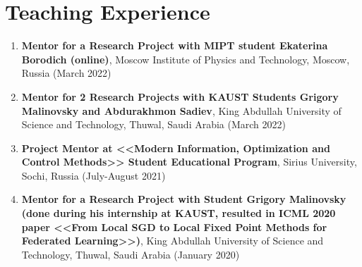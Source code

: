 \section{Teaching Experience}

\newcommand{\teaching}[3]{{\bf #1}, #2 (#3)}

\begin{enumerate}
	
	\item \teaching{Mentor for a Research Project with MIPT student Ekaterina Borodich (online)}{Moscow Institute of Physics and Technology, Moscow, Russia}{March 2022}
	
	\item \teaching{Mentor for 2 Research Projects with KAUST Students Grigory Malinovsky and Abdurakhmon Sadiev}{King Abdullah University of Science and Technology, Thuwal, Saudi Arabia}{March 2022}
	
	
	
	\item \teaching{Project Mentor at <<Modern Information, Optimization and Control Methods>> Student Educational Program}{Sirius University, Sochi, Russia}{July-August 2021}
	
	\item \teaching{Mentor for a Research Project with Student Grigory Malinovsky (done during his internship at KAUST, resulted in ICML 2020 paper <<From Local SGD to Local Fixed Point Methods for Federated Learning>>)}{King Abdullah University of Science and Technology, Thuwal, Saudi Arabia}{January 2020}
	
	
\end{enumerate}